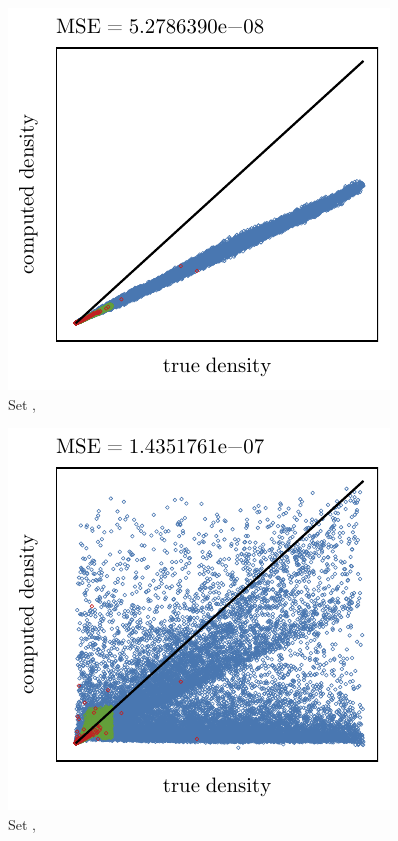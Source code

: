 
\begin{subfigure}{0.23\textwidth}
	\centering
	\includegraphics[keepaspectratio=true, width=\textwidth, height=0.23\textheight]{4/img/results_ferdosi_2_60000_mbe_silverman}
	\caption{Set \ferdosiTwo, \mbe}
	\label{fig:4:results:mbe:ferdosi2}
\end{subfigure}
\begin{subfigure}{0.23\textwidth}
	\centering
	\includegraphics[keepaspectratio=true, width=\textwidth, height=0.23\textheight]{4/img/results_ferdosi_2_60000_sambe_silverman}
	\caption{Set \ferdosiTwo, \sambe}
	\label{fig:4:results:sambe:ferdosi2}
\end{subfigure}
